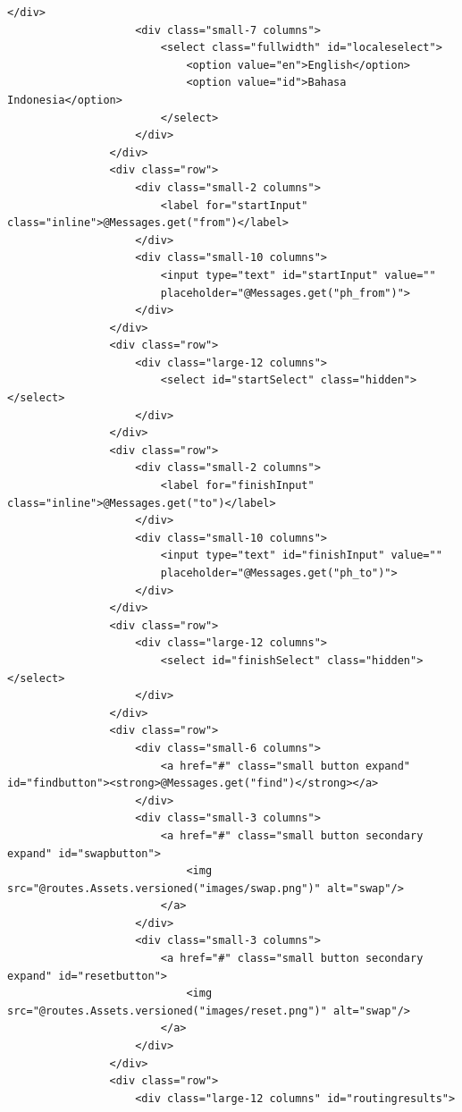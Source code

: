 \documentclass[a4paper,twoside]{article}
\begin{document}
\begin{enumerate}
\begin{lstlisting}[caption=Template \textit{view} pada Play Framework]
                    </div>
                    <div class="small-7 columns">
                        <select class="fullwidth" id="localeselect">
                            <option value="en">English</option>
                            <option value="id">Bahasa Indonesia</option>
                        </select>
                    </div>
                </div>
                <div class="row">
                    <div class="small-2 columns">
                        <label for="startInput" class="inline">@Messages.get("from")</label>
                    </div>
                    <div class="small-10 columns">
                        <input type="text" id="startInput" value=""
                        placeholder="@Messages.get("ph_from")">
                    </div>
                </div>
                <div class="row">
                    <div class="large-12 columns">
                        <select id="startSelect" class="hidden"></select>
                    </div>
                </div>
                <div class="row">
                    <div class="small-2 columns">
                        <label for="finishInput" class="inline">@Messages.get("to")</label>
                    </div>
                    <div class="small-10 columns">
                        <input type="text" id="finishInput" value=""
                        placeholder="@Messages.get("ph_to")">
                    </div>
                </div>
                <div class="row">
                    <div class="large-12 columns">
                        <select id="finishSelect" class="hidden"></select>
                    </div>
                </div>
                <div class="row">
                    <div class="small-6 columns">
                        <a href="#" class="small button expand" id="findbutton"><strong>@Messages.get("find")</strong></a>
                    </div>
                    <div class="small-3 columns">
                        <a href="#" class="small button secondary expand" id="swapbutton">
                            <img src="@routes.Assets.versioned("images/swap.png")" alt="swap"/>
                        </a>
                    </div>
                    <div class="small-3 columns">
                        <a href="#" class="small button secondary expand" id="resetbutton">
                            <img src="@routes.Assets.versioned("images/reset.png")" alt="swap"/>
                        </a>
                    </div>
                </div>
                <div class="row">
                    <div class="large-12 columns" id="routingresults">

\end{lstlisting}
\end{enumerate}
\end{document}

